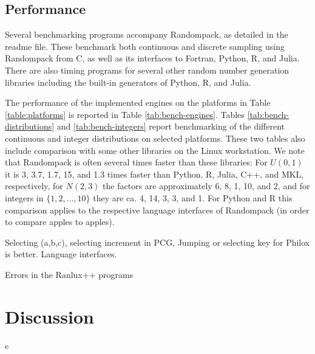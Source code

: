 \documentclass[manuscript,screen,review]{acmart}
\begin{document}
\subsection{Performance}
Several benchmarking programs accompany Randompack, as detailed in the
readme file. These benchmark both continuous and discrete sampling
using Randompack from C, as well as its interfaces to Fortran, Python,
R, and Julia. There are also timing programs for several other random
number generation libraries including the built-in generators of
Python, R, and Julia.

The performance of the implemented engines on the platforms in Table
\ref{table:platforms} is reported in Table \ref{tab:bench-engines}.
Tables \ref{tab:bench-distributions} and \ref{tab:bench-integers}
report benchmarking of the different continuous and integer
distributions on selected platforms. These two tables also include
comparison with some other libraries on the Linux workstation. We note
that Randompack is often several times faster than these libraries:
For $U(0,1)$ it is 3, 3.7, 1.7, 15, and 1.3 times faster than Python,
R, Julia, C++, and MKL, respectively, for $N(2,3)$ the factors are
approximately 6, 8, 1, 10, and 2, and for integers in
$\{1,2,\ldots,10\}$ they are ca. 4, 14, 3, 3, and 1. For Python and R
this comparison applies to the respective language interfaces of
Randompack (in order to compare apples to apples).

Selecting (a,b,c), selecting increment in PCG, Jumping or selecting
key for Philox is better. Language interfaces.

Errors in the Ranlux++ programs

\section{Discussion}



e%
\end{document}
